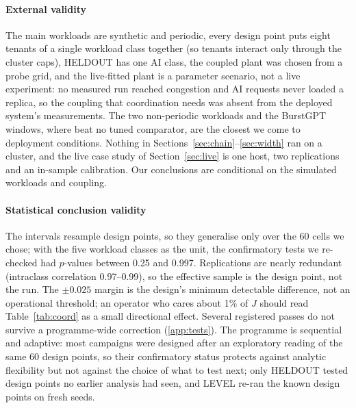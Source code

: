 \paragraph{External validity}
The main workloads are synthetic and periodic, every design point puts
eight tenants of a single workload class together (so tenants interact
only through the cluster caps), HELDOUT has one AI class, the coupled plant was chosen from a probe grid, and the live-fitted
plant is a parameter scenario, not a live experiment: no measured run
reached congestion and AI requests never loaded a replica, so the coupling
that coordination needs was absent from the deployed system's
measurements. The two non-periodic workloads and the BurstGPT windows,
where \jcac{} beat no tuned comparator, are the closest we come to
deployment conditions. Nothing in Sections~\ref{sec:chain}--\ref{sec:width}
ran on a cluster, and the live case study of Section~\ref{sec:live} is one
host, two replications and an in-sample calibration. Our conclusions are
conditional on the simulated workloads and coupling.

\paragraph{Statistical conclusion validity}
The intervals resample design points, so they generalise only over the
60 cells we chose; with the five workload classes as the unit, the
confirmatory tests we re-checked had $p$-values between 0.25 and 0.997. Replications are
nearly redundant (intraclass correlation 0.97--0.99), so the effective
sample is the design point, not the run. The $\pm0.025$ margin is the
design's minimum detectable difference, not an operational threshold; an
operator who cares about 1\% of $J$ should read Table~\ref{tab:coord} as a
small directional effect. Several registered passes do not survive a
programme-wide correction (\ref{app:tests}). The programme is sequential
and adaptive: most campaigns were designed after an exploratory reading of
the same 60 design points, so their confirmatory status protects against
analytic flexibility but not against the choice of what to test next; only
HELDOUT tested design points no earlier analysis had seen, and LEVEL re-ran
the known design points on fresh seeds.


